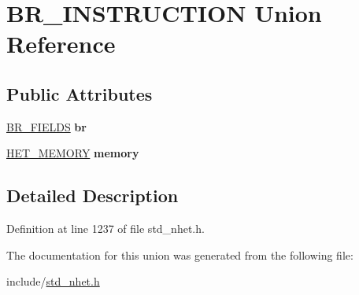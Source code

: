 \hypertarget{unionBR__INSTRUCTION}{}\section{B\+R\+\_\+\+I\+N\+S\+T\+R\+U\+C\+T\+I\+ON Union Reference}
\label{unionBR__INSTRUCTION}
\subsection*{Public Attributes}
\begin{DoxyCompactItemize}
\item 
\mbox{\label{unionBR__INSTRUCTION_a34306672dbc4bf19ffab83bad9c8d91e}} 
\mbox{\hyperlink{structbr__format}{B\+R\+\_\+\+F\+I\+E\+L\+DS}} {\bfseries br}
\item 
\mbox{\label{unionBR__INSTRUCTION_ab88276f67ca41f1c3fb408d27b232e7b}} 
\mbox{\hyperlink{structmemory__format}{H\+E\+T\+\_\+\+M\+E\+M\+O\+RY}} {\bfseries memory}
\end{DoxyCompactItemize}


\subsection{Detailed Description}


Definition at line 1237 of file std\+\_\+nhet.\+h.



The documentation for this union was generated from the following file\+:\begin{DoxyCompactItemize}
\item 
include/\mbox{\hyperlink{std__nhet_8h}{std\+\_\+nhet.\+h}}\end{DoxyCompactItemize}
